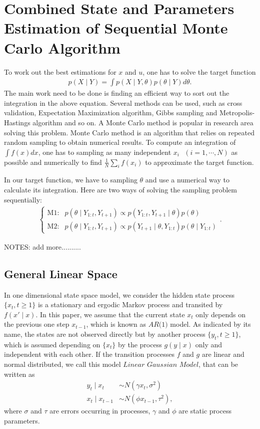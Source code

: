 \section{Combined State and Parameters Estimation of Sequential Monte Carlo Algorithm}

To work out the best estimations for $x$ and $u$, one has to solve the target function
\begin{align}\label{objecfun}
p(X\mid Y) = \int p(X\mid Y,\theta)p(\theta\mid Y)d\theta.
\end{align} 
The main work need to be done is finding an efficient way to sort out the integration in the above equation. Several methods can be used, such as cross validation, Expectation Maximization algorithm, Gibbs sampling and Metropolis-Hastings algorithm and so on. A Monte Carlo method is popular in research area solving this problem. Monte Carlo method is an algorithm that relies on repeated random sampling to obtain numerical results. To compute an integration of $\int f(x)dx$, one has to sampling as many independent $x_i \mbox{ } (i = 1,\cdots, N)$ as possible and numerically to find $\frac{1}{N}\sum_i f(x_i)$ to approximate the target function. 

In our target function, we have to sampling $\theta$ and use a numerical way to calculate its integration. Here are two ways of solving the sampling problem sequentially: 
\begin{align*}
\begin{cases}
\mbox{M1}: & p(\theta\mid Y_{1:t},Y_{t+1}) \propto p(Y_{1:t},Y_{t+1}\mid\theta)p(\theta)\\
\mbox{M2}: & p(\theta\mid Y_{1:t},Y_{t+1}) \propto p(Y_{t+1}\mid\theta,Y_{1:t})p(\theta\mid Y_{1:t})
\end{cases}.
\end{align*}


NOTES: add more..........


\subsection{General Linear Space}
In one dimensional state space model, we consider the hidden state process $\{x_t, t\geq 1\}$ is a stationary and ergodic Markov process and transited by $f(x'\mid x)$. In this paper, we assume that the current state $x_t$ only depends on the previous one step $x_{t-1}$, which is known as $\textit{AR(1)}$ model. As indicated by its name, the states are not observed directly but by another process $\{y_t, t\geq 1\}$, which is assumed depending on $\{x_t\}$ by the process $g(y\mid x)$ only and independent with each other. If the transition processes $f$ and $g$ are linear and normal distributed, we call this model $\textit{Linear Gaussian Model}$, that can be written as
\begin{align*}
y_t\mid x_t      &\sim N(\gamma x_t,\sigma^2) \\
x_t\mid x_{t-1} &\sim N(\phi x_{t-1},\tau^2),
\end{align*}
where $\sigma$ and $\tau$ are errors occurring in processes, $\gamma$ and $\phi$ are static process parameters. 

